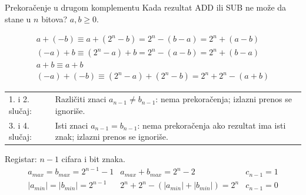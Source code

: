 
\begin{frame}[label=05-s026]{Prekoračenje u drugom komplementu}
\fontsize{10}{12}\selectfont\setlength{\abovedisplayskip}{4pt}\setlength{\belowdisplayskip}{4pt}
Kada rezultat ADD ili SUB ne može da stane u $n$ bitova?
$a,b\geq0$.\par
\[\begin{gathered}a+(-b)\equiv a+(2^n-b)=2^n-(b-a)=2^n+(a-b)\\(-a)+b\equiv(2^n-a)+b=2^n-(a-b)=2^n+(b-a)\\[1mm]a+b\equiv a+b\\(-a)+(-b)\equiv(2^n-a)+(2^n-b)=2^n+2^n-(a+b)\end{gathered}\]
\begin{tabularx}{\textwidth}{@{}p{2.3cm}X@{}}
1. i 2. slučaj:&Različiti znaci $a_{n-1}\neq b_{n-1}$: nema prekoračenja; izlazni prenos se ignoriše.\\[1mm]
3. i 4. slučaj:&Isti znaci $a_{n-1}=b_{n-1}$: nema prekoračenja ako rezultat ima isti znak; izlazni prenos se ignoriše.
\end{tabularx}\par\vspace{0mm}
Registar: $n-1$ cifara i bit znaka.
\[\begin{array}{lll}a_{max}=b_{max}=2^{n-1}-1&a_{max}+b_{max}=2^n-2&c_{n-1}=1\\[1mm]|a_{min}|=|b_{min}|=2^{n-1}&2^n+2^n-(|a_{min}|+|b_{min}|)=2^n&c_{n-1}=0\end{array}\]
\end{frame}
